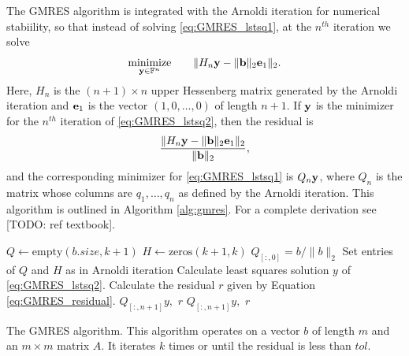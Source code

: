 The GMRES algorithm is integrated with the Arnoldi iteration for numerical stabiility, so that instead of solving \eqref{eq:GMRES_lstsq1}, at the $n^{th}$ iteration we solve
\begin{equation}
\underset{{\bf y} \in \mathbb{F}^n}{\text{minimize}}\qquad \|H_n {\bf y} - \|{\bf b}\|_2{\bf e}_1\|_2.
\label{eq:GMRES_lstsq2}
\end{equation}
Here, $H_n$ is the $(n+1)\times n$ upper Hessenberg matrix generated by the Arnoldi iteration and ${\bf e}_1$ is the vector $(1, 0, \ldots, 0)$ of length $n+1$.
If ${\bf y}$ is the minimizer for the $n^{th}$ iteration of \eqref{eq:GMRES_lstsq2}, then the residual is
\begin{equation}
\frac{\|H_n {\bf y} - \|{\bf b}\|_2{\bf e}_1\|_2}{\|{\bf b}\|_2},
\label{eq:GMRES_residual}
\end{equation}
and the corresponding minimizer for \eqref{eq:GMRES_lstsq1} is $Q_n{\bf y}$, where $Q_n$ is the matrix whose columns are $q_1, \ldots, q_n$ as defined by the Arnoldi iteration.
This algorithm is outlined in Algorithm \ref{alg:gmres}.
For a complete derivation see [TODO: ref textbook].

\begin{algorithm}
\begin{algorithmic}[1]
	\State $Q \gets \text{empty}\left(b.size, k+1\right)$			
	\State $H \gets \text{zeros}\left(k+1, k\right)$
	\State $Q_{[:,0]} = b/\|b\|_2$
        \State Set entries of $Q$ and $H$ as in Arnoldi iteration
        \State Calculate least squares solution $y$ of \ref{eq:GMRES_lstsq2}.
        \State Calculate the residual $r$ given by Equation \ref{eq:GMRES_residual}.
            \State {} $Q_{[:,n+1]}y, \,\, r$
        \EndIf
    \EndFor
    \State {} $Q_{[:,n+1]}y, \,\, r$						
\EndProcedure
\end{algorithmic}
\caption{The GMRES algorithm. This algorithm operates on a vector $b$ of length $m$ and an $m \times m$ matrix $A$. It iterates $k$ times or until the residual is less than $tol$.}
\label{alg:gmres}
\end{algorithm}


